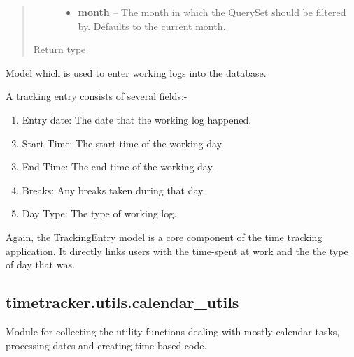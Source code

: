 \documentclass[letterpaper,10pt,english]{sphinxmanual}
\begin{document}
\begin{fulllineitems}
\begin{fulllineitems}
\begin{quote}
\begin{description}
\begin{itemize}
\item {} 
\textbf{month} -- The month in which the QuerySet should be filtered
by. Defaults to the current month.

\end{itemize}

\item[{Return type}] \leavevmode
{}

\end{description}\end{quote}

\end{fulllineitems}


\end{fulllineitems}


\begin{fulllineitems}
\label{code:timetracker.tracker.models.TrackingEntry}
Model which is used to enter working logs into the database.

A tracking entry consists of several fields:-
\begin{enumerate}
\item {} 
Entry date: The date that the working log happened.

\item {} 
Start Time: The start time of the working day.

\item {} 
End Time: The end time of the working day.

\item {} 
Breaks: Any breaks taken during that day.

\item {} 
Day Type: The type of working log.

\end{enumerate}

Again, the TrackingEntry model is a core component of the time tracking
application. It directly links users with the time-spent at work and the
the type of day that was.

\end{fulllineitems}



\subsection{timetracker.utils.calendar\_utils}
\label{code:timetracker-utils-calendar-utils}\label{code:module-timetracker.utils.calendar_utils}
Module for collecting the utility functions dealing with mostly calendar
tasks, processing dates and creating time-based code.
\end{document}
